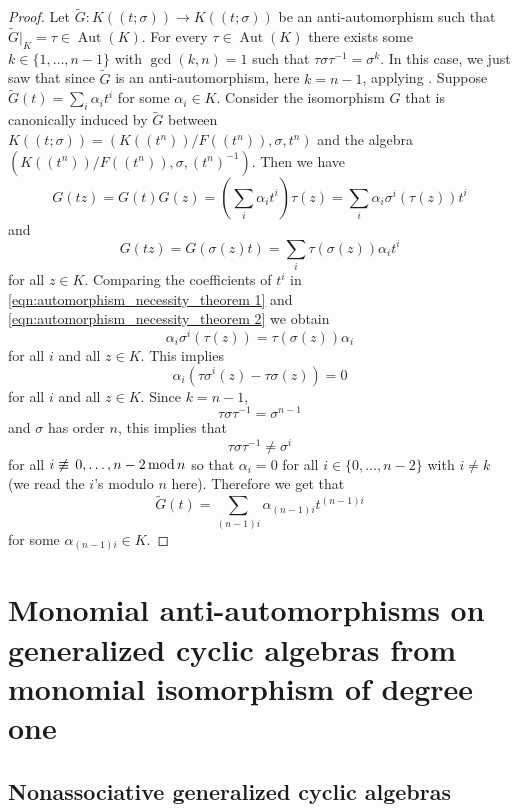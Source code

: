 \documentclass{amsart}
\theoremstyle{plain}
\theoremstyle{definition}
\numberwithin{equation}{section}
\numberwithin{figure}{section}
\DeclareMathOperator{\Aut}{Aut}
\begin{document}
 \begin{proof}
  Let $\widetilde G:K((t;\sigma))\to K((t;\sigma))$ be an anti-automorphism such that $\widetilde G|_K=\tau\in \Aut(K)$. For every $\tau\in \Aut(K)$ there exists some
  $k\in \{1,\dots, n-1 \}$ with $\gcd (k, n)=1$ such that $\tau \sigma\tau^{-1}=\sigma^k$. In this case, we just saw that since $\widetilde G$ is an anti-automorphism, here $k=n-1$, applying \cite{MST}.
 Suppose $\widetilde G(t) = \sum_{i}\alpha_i t^i$ for some $\alpha_i \in K$. Consider the isomorphism $G$ that is canonically induced by $\widetilde G$ between $K((t;\sigma))=(K((t^n))/F((t^n)),\sigma, t^n)$ and the  algebra $(K((t^n))/F((t^n)),\sigma, (t^n)^{-1})$.
Then we have
\begin{equation} \label{eqn:automorphism_necessity_theorem 1l}
G(tz) = G(t)G(z) = (\sum_{i} \alpha_i t^i ) \tau(z) =
\sum_{i} \alpha_i \sigma^{i}(\tau(z)) t^i \end{equation} and
\begin{equation} \label{eqn:automorphism_necessity_theorem 2l}
G(tz) =
G(\sigma(z)t) = \sum_{i} \tau(\sigma(z)) \alpha_i t^i
\end{equation}
for all $z \in K$. Comparing the coefficients of $t^i$
in \eqref{eqn:automorphism_necessity_theorem 1} and
\eqref{eqn:automorphism_necessity_theorem 2} we obtain
\begin{equation} \label{eqn:automorphism_necessity_theorem 3}
\alpha_i \sigma^{i}(\tau(z)) = \tau(\sigma(z)) \alpha_i
\end{equation}
for all $i $ and all $z \in K$. This implies
$$\alpha_i ( \tau\sigma^i(z) - \tau\sigma(z)  )=0$$
for all $i $ and all $z \in K$. Since
$k=n-1 $,
 $$\tau \sigma\tau^{-1}=\sigma^{n-1}$$
 and $\sigma$ has order $n$, this implies that
 $$\tau \sigma\tau^{-1}\not=\sigma^i$$
 for all  $i \not \equiv \,0, \ldots, n-2 \,{\rm mod} \, n$ so that  $\alpha_i = 0$ for
all  $i \in\{ 0, \ldots, n-2\}$ with $i\not=k$ (we read the $i$'s modulo $n$ here). Therefore
 we get that
 $$\widetilde G(t) = \sum_{(n-1)i}\alpha_{(n-1)i} t^{(n-1)i}$$
  for some $\alpha_{(n-1)i} \in K.$
   \end{proof}



\section{Monomial anti-automorphisms  on generalized cyclic algebras from monomial isomorphism of degree one} \label{sec:nonass}


\subsection{Nonassociative generalized cyclic algebras}
\end{document}
